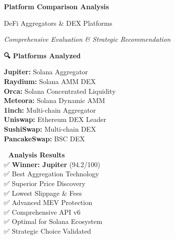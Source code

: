 \documentclass[11pt,a4paper]{article}
\begin{document}
\begin{titlepage}
    \centering
    \vspace*{1cm}
    
    {\Huge\textbf{\textcolor{jupiterBlue}{Platform Comparison Analysis}}\par}
    \vspace{0.5cm}
    {\LARGE\textcolor{deauraPurple}{DeFi Aggregators \& DEX Platforms}\par}
    \vspace{0.3cm}
    {\Large\textit{Comprehensive Evaluation \& Strategic Recommendation}\par}
    
    \vspace{1.5cm}
    
    \begin{tcolorbox}[colback=jupiterBlue!10,colframe=jupiterBlue,width=0.9\textwidth]
        \centering
        \textbf{🔍 Platforms Analyzed}\\
        \vspace{0.5cm}
        \begin{multicols}{2}
        \textbf{Jupiter:} Solana Aggregator\\
        \textbf{Raydium:} Solana AMM DEX\\
        \textbf{Orca:} Solana Concentrated Liquidity\\
        \textbf{Meteora:} Solana Dynamic AMM\\
        \textbf{1inch:} Multi-chain Aggregator\\
        \textbf{Uniswap:} Ethereum DEX Leader\\
        \textbf{SushiSwap:} Multi-chain DEX\\
        \textbf{PancakeSwap:} BSC DEX
        \end{multicols}
    \end{tcolorbox}
    
    \vspace{1.5cm}
    
    \begin{tcolorbox}[colback=successGreen!10,colframe=successGreen,width=0.8\textwidth]
        \centering
        \textbf{🎯 Analysis Results}\\
        \vspace{0.3cm}
        ✅ \textbf{Winner: Jupiter} (94.2/100)\\
        ✅ Best Aggregation Technology\\
        ✅ Superior Price Discovery\\
        ✅ Lowest Slippage \& Fees\\
        ✅ Advanced MEV Protection\\
        ✅ Comprehensive API v6\\
        ✅ Optimal for Solana Ecosystem\\
        ✅ Strategic Choice Validated
    \end{tcolorbox}
    

\end{titlepage}
\end{document}
